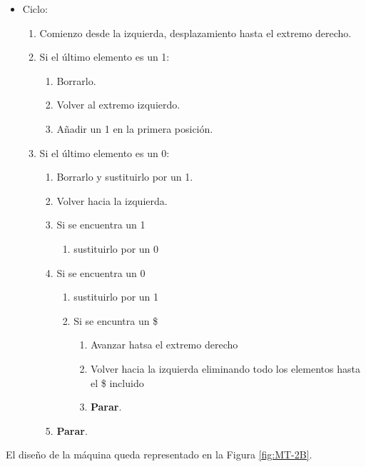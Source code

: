 \begin{itemize}
    \item Ciclo:
    \begin{enumerate}[1.]
        \item Comienzo desde la izquierda, desplazamiento hasta el extremo derecho.
        \item Si el último elemento es un 1:
        \begin{enumerate}[1.]
            \item Borrarlo.
            \item Volver al extremo izquierdo.
            \item Añadir un 1 en la primera posición.
        \end{enumerate}
        \item Si el último elemento es un 0:
        \begin{enumerate}[1.]
            \item Borrarlo y sustituirlo por un 1.
            \item Volver hacia la izquierda.
            \item Si se encuentra un 1 
            \begin{enumerate}[1.] 
                \item sustituirlo por un 0
            \end{enumerate}
            \item Si se encuentra un 0
            \begin{enumerate}[1.]
                \item sustituirlo por un 1
                \item Si se encuntra un \$
                \begin{enumerate}[1.]
                    \item Avanzar hatsa el extremo derecho
                    \item Volver hacia la izquierda eliminando todo los elementos hasta el \$ incluido
                    \item \textbf{Parar}.
                \end{enumerate}
            \end{enumerate}
            \item \textbf{Parar}.
        \end{enumerate}
    \end{enumerate}
\end{itemize}

El diseño de la máquina queda representado en la Figura \ref{fig:MT-2B}.

